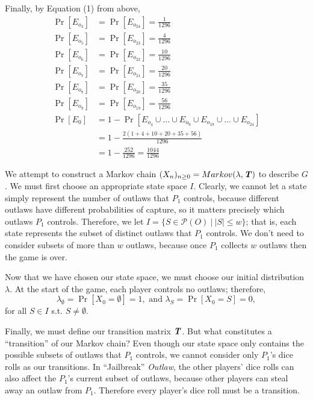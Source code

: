 \documentclass{article}
\newcommand{\T}{\textbf{\textit{T}}}
\theoremstyle{definition}
\theoremstyle{plain}
\begin{document}
	Finally, by Equation (1) from above,
	\begin{align*}
	\Pr[E_{o_4}] &= \Pr[E_{o_{24}}] = \tfrac{1}{1296}\\
	\Pr[E_{o_5}] &= \Pr[E_{o_{23}}] = \tfrac{4}{1296}\\
	\Pr[E_{o_6}] &= \Pr[E_{o_{22}}] = \tfrac{10}{1296}\\
	\Pr[E_{o_7}] &= \Pr[E_{o_{21}}] = \tfrac{20}{1296}\\
	\Pr[E_{o_8}] &= \Pr[E_{o_{20}}] = \tfrac{35}{1296}\\
	\Pr[E_{o_9}] &= \Pr[E_{o_{19}}] = \tfrac{56}{1296}\\
	\Pr[E_0] &= 1 - \Pr[E_{o_4} \cup \dots \cup E_{o_9} \cup E_{o_{19}} \cup \dots \cup E_{o_{24}}]\\
		&= 1 - \frac{2(1 + 4 + 10 + 20 + 35 + 56)}{1296}\\
		&= 1 - \frac{252}{1296} = \frac{1044}{1296}
	\end{align*}

We attempt to construct a Markov chain $(X_n)_{n \geq 0} = Markov(\lambda, \T)$ to describe $G$. We must first choose an appropriate state space $I$. Clearly, we cannot let a state simply represent the number of outlaws that $P_1$ controls, because different outlaws have different probabilities of capture, so it matters precisely which outlaws $P_1$ controls.  Therefore, we let $I = \{S \in \mathcal{P}(O) ~\big|~ |S| \leq w\}$; that is, each state represents the subset of distinct outlaws that $P_1$ controls. We don't need to consider subsets of more than $w$ outlaws, because once $P_1$ collects $w$ outlaws then the game is over.

	Now that we have chosen our state space, we must choose our initial distribution $\lambda$. At the start of the game, each player controls no outlaws; therefore, \[\lambda_\emptyset = \Pr[X_0 = \emptyset] = 1, \text{ and }\lambda_S = \Pr[X_0 = S] = 0,\] for all $S \in I$ s.t. $S \neq \emptyset$.

	Finally, we must define our transition matrix $\T$. But what constitutes a ``transition'' of our Markov chain? Even though our state space only contains the possible subsets of outlaws that $P_1$ controls, we cannot consider only $P_1$'s dice rolls as our transitions. In ``Jailbreak'' \textit{Outlaw}, the other players' dice rolls can also affect the $P_1$'s current subset of outlaws, because other players can steal away an outlaw from $P_1$. Therefore every player's dice roll must be a transition.
\end{document}
